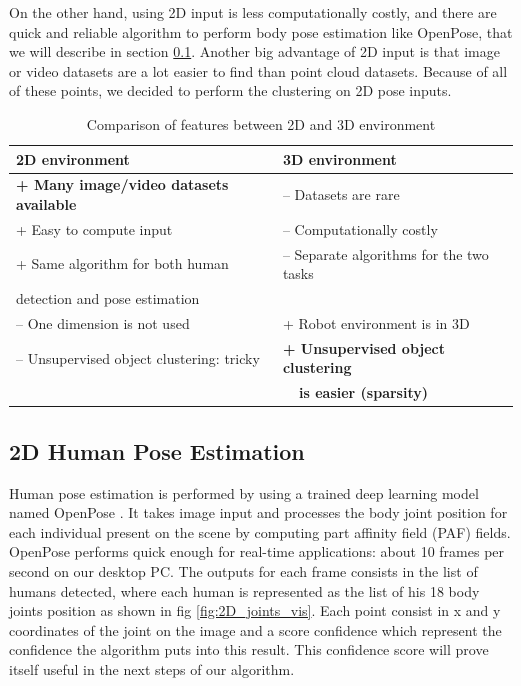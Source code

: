 On the other hand, using 2D input is less computationally costly, and there are quick and reliable algorithm to perform body pose estimation like OpenPose, that we will describe in section \ref{section:openpose}. Another big advantage of 2D input is that image or video datasets are a lot easier to find than point cloud datasets. Because of all of these points, we decided to perform the clustering on 2D pose inputs.

\begin{table}[h]
    \centering
    \caption{Comparison of features between 2D and 3D environment}
    \label{tab:dimension_comparison}
    \begin{tabular}{|l|l|}
        \hline
        2D environment & 3D environment \\ \hline
        \textbf{+ Many image/video datasets available} & -- Datasets are rare \\
        + Easy to compute input & -- Computationally costly \\
        + Same algorithm for both human & -- Separate algorithms for the two tasks \\ detection and pose estimation & \\
        -- One dimension is not used & + Robot environment is in 3D \\
        -- Unsupervised object clustering: tricky & \textbf{+ Unsupervised object clustering} \\
        & \textbf{~~is easier (sparsity)}
        \\ \hline
    \end{tabular}
\end{table}

\subsection{2D Human Pose Estimation}
\label{section:openpose}
Human pose estimation is performed by using a trained deep learning model named OpenPose \cite{Openpose}. It takes image input and processes the body joint position for each individual present on the scene by computing part affinity field (PAF) fields. OpenPose performs quick enough for real-time applications: about 10 frames per second on our desktop PC. The outputs for each frame consists in the list of humans detected, where each human is represented as the list of his 18 body joints position as shown in fig \ref{fig:2D_joints_vis}. Each point consist in x and y coordinates of the joint on the image and a score confidence which represent the confidence the algorithm puts into this result. This confidence score will prove itself useful in the next steps of our algorithm.

